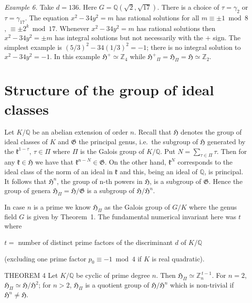 \medskip\noindent
\emph{Example 6.} Take $d=136$. Here $G=\mathbb{Q}(\sqrt{2},\sqrt{17})$.
There is a choice of $\tau=\gamma_{2}$ or $\tau=\gamma_{17}$. The
equation $x^{2}-34y^{2}=m$ has rational solutions for all
$m\equiv\pm 1\bmod 8$, $\equiv\pm 2^{k}\bmod 17$. Whenever
$x^{2}-34y^{2}=m$ has rational solutions then $x^{2}-34y^{2}=\pm m$ has
integral solutions but not necessarily with the $+$ sign. The simplest
example is $(5/3)^{2}-34(1/3)^{2}=-1$; there is no integral solution to
$x^{2}-34y^{2}=-1$. In this example $\mathfrak{H}^{+}\simeq\mathbb{Z}_{4}$
while $\mathfrak{H}^{+}\!_{\Pi}=\mathfrak{H}_{\Pi}
=\mathfrak{H}\simeq\mathbb{Z}_{2}$.

\section{Structure of the group of ideal classes}\label{sec:VII-structure}

Let $K/\mathbb{Q}$ be an abelian extension of order $n$. Recall that
$\mathfrak{H}$ denotes the group of ideal classes of $K$ and
$\mathfrak{G}$ the principal genus, i.e.\ the subgroup of $\mathfrak{H}$
generated by the $\mathfrak{k}^{1-\tau}$, $\tau\in\Pi$ where $\Pi$ is the
Galois group of $K/\mathbb{Q}$. Put $N=\sum_{\tau\in\Pi}\tau$. Then for
any $\mathfrak{k}\in\mathfrak{H}$ we have that
$\mathfrak{k}^{n-N}\in\mathfrak{G}$. On the other hand,
$\mathfrak{k}^{N}$ corresponds to the ideal class of the norm of an ideal
in $\mathfrak{k}$ and this, being an ideal of $\mathbb{Q}$, is principal.
It follows that $\mathfrak{H}^{n}$, the group of n-th powers in
$\mathfrak{H}$, is a subgroup of $\mathfrak{G}$. Hence the group of
genera $\mathfrak{H}_{\Pi}=\mathfrak{H}/\mathfrak{G}$ is a subgroup of
$\mathfrak{H}/\mathfrak{H}^{n}$.

In case $n$ is a prime we know $\mathfrak{H}_{\Pi}$ as the Galois group
of $G/K$ where the genus field $G$ is given by Theorem~1. The fundamental
numerical invariant here was $t$ where

\smallskip
\centerline{$t=$ number of distinct prime factors of the discriminant
$d$ of $K/\mathbb{Q}$}

\smallskip
\centerline{(excluding one prime factor $p_{0}\equiv -1\bmod 4$ if $K$
is real quadratic).}
\smallskip

\begin{namedstmt}{THEOREM 4}
Let $K/\mathbb{Q}$ be cyclic of prime degree $n$. Then
$\mathfrak{H}_{\Pi}\simeq\mathbb{Z}_{n}^{\,t-1}$. For $n=2$,
$\mathfrak{H}_{\Pi}\simeq\mathfrak{H}/\mathfrak{H}^{2}$; for $n>2$,
$\mathfrak{H}_{\Pi}$ is a quotient group of $\mathfrak{H}/\mathfrak{H}^{n}$
which is non-trivial if $\mathfrak{H}^{n}\neq\mathfrak{H}$.
\end{namedstmt}

